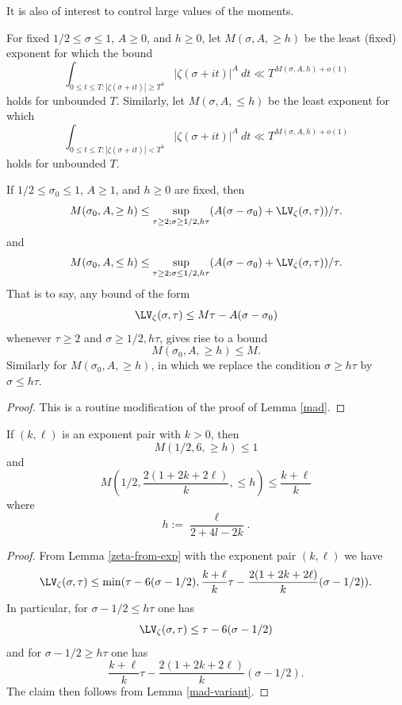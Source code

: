 It is also of interest to control large values of the moments.

\begin{definition}\label{mixed-moment-def}
    For fixed $1/2 \leq \sigma \leq 1$, $A \geq 0$, and $h \geq 0$, let $M(\sigma,A, \geq h)$ be the least (fixed) exponent for which the bound
$$ \int_{0 \leq t \leq T: |\zeta(\sigma+it)| \geq T^h} |\zeta(\sigma+it)|^A\ dt \ll T^{M(\sigma,A,h)+o(1)}$$
holds for unbounded $T$.
Similarly, let $M(\sigma,A,\leq h)$ be the least exponent for which
$$ \int_{0 \leq t \leq T: |\zeta(\sigma+it)| < T^h} |\zeta(\sigma+it)|^A\ dt \ll T^{M(\sigma,A,h)+o(1)}$$
holds for unbounded $T$.
\end{definition}

\begin{lemma}\label{mad-variant}  If $1/2 \leq \sigma_0 \leq 1$, $A \geq 1$, and $h \geq 0$ are fixed, then
    \begin{equation}\label{msah}
        M(\sigma_0,A,\geq h) \leq \sup_{\tau \geq 2; \sigma \geq 1/2, h\tau} (A(\sigma-\sigma_0) + \LV_\zeta(\sigma,\tau))/\tau.
    \end{equation}
and
\begin{equation}\label{msah-2}
    M(\sigma_0,A,\leq h) \leq \sup_{\tau \geq 2; \sigma \leq 1/2, h\tau} (A(\sigma-\sigma_0) + \LV_\zeta(\sigma,\tau))/\tau.
\end{equation}
That is to say, any bound of the form
$$ \LV_\zeta(\sigma,\tau) \leq M \tau - A (\sigma - \sigma_0)$$
whenever $\tau \geq 2$ and $\sigma \geq 1/2, h\tau$, gives rise to a bound
$$ M(\sigma_0,A,\geq h) \leq M.$$
Similarly for $M(\sigma_0,A,\geq h)$, in which we replace the condition $\sigma \geq h\tau$ by $\sigma \leq h\tau$.
\end{lemma}

\begin{proof} This is a routine modification of the proof of Lemma \ref{mad}.
\end{proof}

\begin{corollary}\label{ivic-split}  If $(k,\ell)$ is an exponent pair with $k > 0$, then
    $$ M(1/2,6, \geq h) \leq 1$$
and
$$ M\left(1/2,\frac{2(1+2k+2\ell)}{k}, \leq h\right) \leq \frac{k+\ell}{k}$$
where
$$ h := \frac{\ell}{2+4l-2k}.$$
\end{corollary}

\begin{proof} From Lemma \ref{zeta-from-exp} with the exponent pair $(k,\ell)$ we have
$$ \LV_\zeta(\sigma,\tau) \leq \min( \tau - 6(\sigma-1/2), \frac{k+\ell}{k}\tau - \frac{2(1+2k+2\ell)}{k} (\sigma-1/2) ).$$
In particular, for $\sigma-1/2 \leq h\tau$ one has
$$ \LV_\zeta(\sigma,\tau) \leq \tau - 6(\sigma-1/2)$$
and for $\sigma-1/2 \geq h\tau$ one has
$$ \frac{k+\ell}{k}\tau - \frac{2(1+2k+2\ell)}{k} (\sigma-1/2).$$
The claim then follows from Lemma \ref{mad-variant}.
\end{proof}


